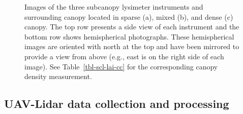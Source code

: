 \documentclass[
  letterpaper,
  DIV=11,
  numbers=noendperiod]{scrartcl}
\begin{document}
\begin{figure}[H]


\caption{\label{fig-scl-imgs}Images of the three subcanopy lysimeter
instruments and surrounding canopy located in sparse (a), mixed (b), and
dense (c) canopy. The top row presents a side view of each instrument
and the bottom row shows hemispherical photographs. These hemispherical
images are oriented with north at the top and have been mirrored to
provide a view from above (e.g., east is on the right side of each
image). See Table~\ref{tbl-scl-lai-cc} for the corresponding canopy
density measurement.}

\end{figure}%

\subsection{UAV-Lidar data collection and
processing}\label{uav-lidar-data-collection-and-processing}
\end{document}
